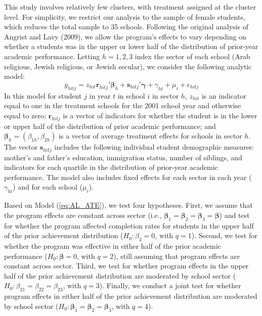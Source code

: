 \documentclass[12pt]{article}
\begin{document}
This study involves relatively few clusters, with treatment assigned at
the cluster level. For simplicity, we restrict our analysis to the
sample of female students, which reduces the total sample to 35 schools.
Following the original analysis of Angrist and Lavy (2009), we allow the
program's effects to vary depending on whether a students was in the
upper or lower half of the distribution of prior-year academic
performance. Letting \(h = 1,2,3\) index the sector of each school (Arab
religious, Jewish religious, or Jewish secular), we consider the
following analytic model: \begin{equation}
\label{eq:AL_ATE}
y_{hitj} = z_{hit}\mathbf{r}_{hitj}'\boldsymbol\beta_h + \mathbf{s}_{hitj}'\boldsymbol\gamma + \gamma_{ht} + \mu_{i} + \epsilon_{hitj}
\end{equation} In this model for student \(j\) in year \(t\) in school
\(i\) in sector \(h\), \(z_{hit}\) is an indicator equal to one in the
treatment schools for the 2001 school year and otherwise equal to zero;
\(\mathbf{r}_{hitj}\) is a vector of indicators for whether the student
is in the lower or upper half of the distribution of prior academic
performance; and
\(\boldsymbol\beta_h = \left(\beta_{1h}, \beta_{2h}\right)\) is a vector
of average treatment effects for schools in sector \(h\). The vector
\(\mathbf{s}_{hitj}\) includes the following individual student
demographic measures: mother's and father's education, immigration
status, number of siblings, and indicators for each quartile in the
distribution of prior-year academic performance. The model also includes
fixed effects for each sector in each year (\(\gamma_{ht}\)) and for
each school (\(\mu_{i}\)).

Based on Model (\ref{eq:AL_ATE}), we test four hypotheses. First, we
assume that the program effects are constant across sector (i.e.,
\(\boldsymbol\beta_1 = \boldsymbol\beta_2 = \boldsymbol\beta_3 = \boldsymbol\beta\))
and test for whether the program affected completion rates for students
in the upper half of the prior achievement distribution
(\(H_0: \beta_2 = 0\), with \(q = 1\)). Second, we test for whether the
program was effective in either half of the prior academic performance
(\(H_0: \boldsymbol\beta = 0\), with \(q = 2\)), still assuming that
program effects are constant across sector. Third, we test for whether
program effects in the upper half of the prior achievement distribution
are moderated by school sector
(\(H_0: \beta_{21} = \beta_{22} = \beta_{23}\), with \(q = 3\)).
Finally, we conduct a joint test for whether program effects in either
half of the prior achievement distribution are moderated by school
sector
(\(H_0: \boldsymbol\beta_1 = \boldsymbol\beta_2 = \boldsymbol\beta_3\),
with \(q = 4\)).
\end{document}
